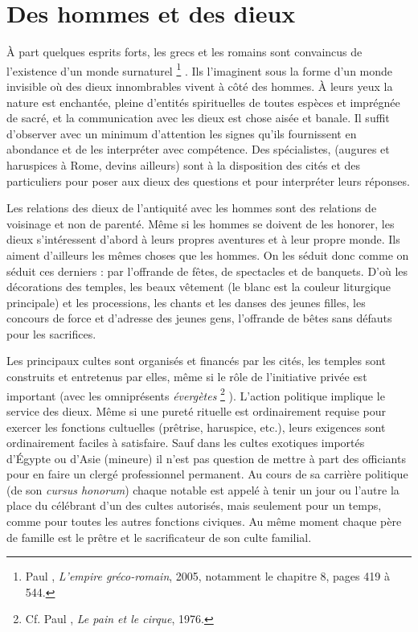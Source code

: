 

\section{Des hommes et des dieux}

À part quelques esprits forts, les grecs et les romains sont convaincus de l'existence d'un monde surnaturel%
\footnote{Paul , \emph{L'empire gréco-romain}, 2005, notamment le chapitre 8, pages 419 à 544.}%
. Ils l'imaginent sous la forme d'un monde invisible où des dieux innombrables vivent à côté des hommes. À leurs yeux la nature est enchantée, pleine d'entités spirituelles de toutes espèces et imprégnée de sacré, et la communication avec les dieux est chose aisée et banale. Il suffit d'observer avec un minimum d'attention les signes qu'ils fournissent en abondance et de les interpréter avec compétence. Des spécialistes, (augures et haruspices à Rome, devins ailleurs) sont à la disposition des cités et des particuliers pour poser aux dieux des questions et pour interpréter leurs réponses.

 Les relations des dieux de l'antiquité avec les hommes sont des relations de voisinage et non de parenté. Même si les hommes se doivent de les honorer, les dieux s'intéressent d'abord à leurs propres aventures et à leur propre monde. Ils aiment d'ailleurs les mêmes choses que les hommes. On les séduit donc comme on séduit ces derniers : par l'offrande de fêtes, de spectacles et de banquets. D'où les décorations des temples, les beaux vêtement (le blanc est la couleur liturgique principale) et les processions, les chants et les danses des jeunes filles, les concours de force et d'adresse des jeunes gens, l'offrande de bêtes sans défauts pour les sacrifices. 

 Les principaux cultes sont organisés et financés par les cités, les temples sont construits et entretenus par elles, même si le rôle de l'initiative privée est important (avec les omniprésents \emph{évergètes}%
\footnote{Cf. Paul , \emph{Le pain et le cirque}, 1976.}%
 ). L'action politique implique le service des dieux. Même si une pureté rituelle est ordinairement requise pour exercer les fonctions cultuelles (prêtrise, haruspice, etc.), leurs exigences sont ordinairement faciles à satisfaire. Sauf dans les cultes exotiques importés d'Égypte ou d'Asie (mineure) il n'est pas question de mettre à part des officiants pour en faire un clergé professionnel permanent. Au cours de sa carrière politique (de son \emph{cursus honorum}) chaque notable est appelé à tenir un jour ou l'autre la place du célébrant d'un des cultes autorisés, mais seulement pour un temps, comme pour toutes les autres fonctions civiques. Au même moment chaque père de famille est le prêtre et le sacrificateur de son culte familial. 

